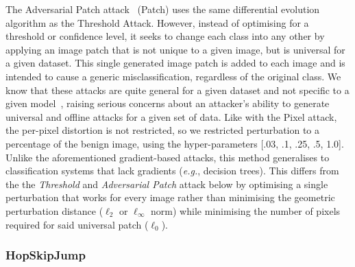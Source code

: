 \documentclass[journal]{IEEEtran}
\begin{document}
The Adversarial Patch attack~\cite{adversarialpatch} (Patch) uses the same differential evolution algorithm as the Threshold Attack.
However, instead of optimising for a threshold or confidence level, it seeks to change each class into any other by applying an image patch that is not unique to a given image, but is universal for a  given dataset.
This single generated image patch is added to each image and is intended to cause a generic misclassification, regardless of the original class.
We know that these attacks are quite general for a given dataset and not specific to a given model~\cite{adversarialpatch,xiao2021improving}, raising serious concerns about an attacker's ability to generate universal and offline attacks for a given set of data.
Like with the Pixel attack, the per-pixel distortion is not restricted, so we restricted perturbation to a percentage of the benign image, using the hyper-parameters [.03, .1, .25, .5, 1.0].
Unlike the aforementioned gradient-based attacks, this method generalises to classification systems that lack gradients (\textit{e.g.}, decision trees).
This differs from the the \textit{Threshold} and \textit{Adversarial Patch} attack below by optimising a single perturbation that works for every image rather than minimising the geometric perturbation distance ($\ell_2$ or $\ell_{\infty}$ norm) while minimising the number of pixels required for said universal patch ($\ell_0$).

\subsubsection{HopSkipJump}
\end{document}
